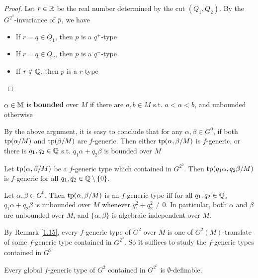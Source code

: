 \documentclass[11pt]{article}
\begin{document}
\begin{proof}
Let \(r\in\mathbb{R}\) be the real number determined by the cut \((Q_1,Q_2)\). By the \(G^{2^0}\)-invariance
of \(\barp\), we have
\begin{itemize}
\item If \(r=q\in Q_1\), then \(p\) is a \(q^+\)-type
\item If \(r=q\in Q_2\), then \(p\) is a \(q^-\)-type
\item If \(r\notin\mathbb{Q}\), then \(p\) is a \(r\)-type
\end{itemize}
\end{proof}

\begin{definition}[]
\(\alpha\in\mathbb{M}\) is \textbf{bounded} over \(M\) if there are \(a,b\in M\) s.t. \(a<\alpha<b\), and unbounded otherwise
\end{definition}

\begin{remark}
\label{2.3}
By the above argument, it is easy to conclude that for any \(\alpha,\beta\in G^0\), if both \(\operatorname{tp}(\alpha/M)\)
and \(\operatorname{tp}(\beta/M)\) are \(f\)-generic. Then either \(\operatorname{tp}(\alpha,\beta/M)\) is \(f\)-generic, or there
is \(q_1,q_2\in\mathbb{Q}\) s.t. \(q_1\alpha+q_2\beta\) is bounded over \(M\)
\end{remark}

\begin{corollary}[]
\label{2.4}
Let \(\operatorname{tp}(\alpha,\beta/M)\) be a \(f\)-generic type which contained in \(G^{2^0}\).
Then \(\operatorname{tp}(q_1\alpha,q_2\beta/M)\) is \(f\)-generic for all \(q_1,q_2\in\mathbb{Q}\setminus\{0\}\).
\end{corollary}

\begin{corollary}[]
\label{2.5}
Let \(\alpha,\beta\in G^0\). Then \(\operatorname{tp}(\alpha,\beta/M)\) is an \(f\)-generic type iff for
all \(q_1,q_2\in\mathbb{Q}\), \(q_1\alpha+q_2\beta\) is unbounded over \(M\) whenever \(q_1^2+q_2^2\neq 0\). In particular,
both \(\alpha\) and \(\beta\) are unbounded over \(M\), and \(\{\alpha,\beta\}\) is algebraic independent over \(M\).
\end{corollary}

\begin{remark}
By Remark \ref{1.15}, every \(f\)-generic type of \(G^2\) over \(M\) is one of \(G^2(M)\)-translate
of some \(f\)-generic type contained in \(G^{2^0}\). So it suffices to study the \(f\)-generic
types contained in \(G^{2^0}\)
\end{remark}

\begin{corollary}[]
Every global \(f\)-generic type of \(G^2\) contained in \(G^{2^0}\) is \(\emptyset\)-definable.
\end{corollary}
\end{document}
